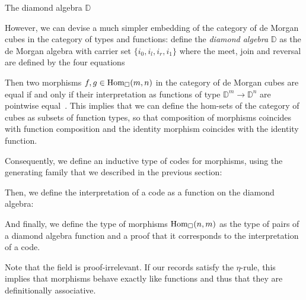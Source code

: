 \begin{marginfigure}
\caption{The diamond algebra \( \mathbb{D} \)}
\end{marginfigure}
% 
However, we can devise a much simpler embedding of the category of de Morgan
cubes in the category of types and functions:
% 
define the \emph{diamond algebra} \( \mathbb{D} \) as the de Morgan algebra with carrier set 
\( \{ i_0, i_l, i_r, i_1 \} \) where the meet, join and reversal are defined by 
the four equations
% 
Then two morphisms \( f, g \in \hom[\catCube]{m}{n} \) in the category of de 
Morgan cubes are equal if and only if their interpretation as functions of type 
\( \mathbb{D}^m \to \mathbb{D}^n \) are pointwise equal~.
% 
This implies that we can define the hom-sets of the category of cubes as 
subsets of function types, so that composition of morphisms coincides 
with function composition and the identity morphism coincides with the 
identity function.

Consequently, we define an inductive type of codes for morphisms, using the
generating family that we described in the previous section: 


Then, we define the interpretation of a code as a function on the diamond
algebra:


And finally, we define the type of morphisms \( \hom[\catCube]{n}{m} \) as the 
type of pairs of a diamond algebra function and a proof that it corresponds to
the interpretation of a code.


Note that the field  is proof-irrelevant.
% 
If our records satisfy the \( \eta \)-rule, this implies that morphisms behave
exactly like functions and thus that they are definitionally associative.

